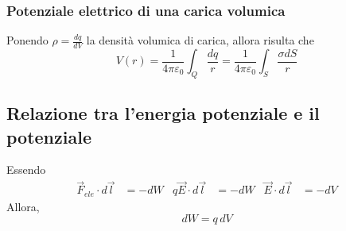 \documentclass[12pt,a4paper]{report}
\begin{document}
		\subsubsection{Potenziale elettrico di una carica volumica}
Ponendo $\rho = \frac{dq}{dV}$ la densità volumica di carica, allora risulta che
		\[V(r)=\frac{1}{4 \pi \varepsilon_{0}} \int_{Q}\frac{dq}{r} = \frac{1}{4 \pi \varepsilon_{0}}\int_{S} \frac{\sigma dS}{r}\]
		
	\subsection{Relazione tra l'energia potenziale e il potenziale}
Essendo
	\begin{align*}
		\vec{F}_{ele} \cdot d\vec{l} &= -dW  & q\vec{E} \cdot d\vec{l} &= -dW & \vec{E} \cdot d\vec{l} &= -dV 
	\end{align*}
Allora, 
		\[dW=q\,dV\]
\end{document}
